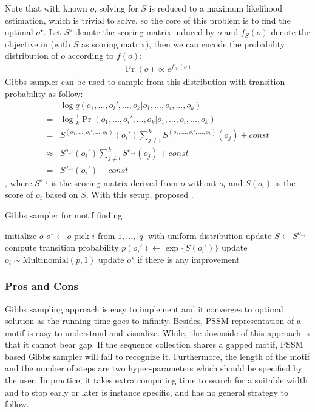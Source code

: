 \documentclass[11pt, oneside]{article}
\begin{document}
Note that with known $o$, solving for $S$ is reduced to a maximum likelihood estimation, which is trivial to solve, so the core of this problem is to find the optimal $o^{\star}$. Let $S^o$ denote the scoring matrix induced by $o$ and $f_{S}(o)$ denote the objective in  (with $S$ as scoring matrix), then we can encode the probability distribution of $o$ according to $f(o)$:
\begin{align*}
  \Pr(o) \propto e^{f_{S^o}(o)}
\end{align*} 
Gibbs sampler can be used to sample from this distribution with transition probability as follow:
\begin{align}
  & \log q(o_1, ..., o_i', ..., o_k|o_1, ..., o_i, ..., o_k) \nonumber \\
  =& \log \frac{1}{k}\Pr(o_1, ..., o_i', ..., o_k|o_1, ..., o_i, ..., o_k) \label{eq:exact}\\
  =& S^{(o_1, ..., o_i', ..., o_k)}(o_i')\sum_{j \neq i}^k S^{(o_1, ..., o_i', ..., o_k)}(o_j) + const \nonumber \\
  \approx& S^{o_{-i}}(o_i')\sum_{j \neq i}^k S^{o_{-i}}(o_j) + const \nonumber \\
  =& S^{o_{-i}}(o_i') + const \label{eq:approx}
\end{align} 
, where $S^{o_{-i}}$ is the scoring matrix derived from $o$ without $o_i$ and $S(o_i)$ is the score of $o_i$ based on $S$. With this setup, \cite{lawrence1993detecting} proposed .
\begin{algorithm}
  \caption{Gibbs sampler for motif finding}
  \label{algo:gibbs}
  \begin{algorithmic}[1]
    \State initialize $o$
    \State $o^{\star} \leftarrow o$
      \State pick $i$ from $1, ..., |q|$ with uniform distribution
      \State update $S \leftarrow S^{o_{-i}}$
      \State compute transition probability $p(o_i') \leftarrow \exp\{S(o_i')\}$
      \State update $o_i \sim \text{Multinomial}(p, 1)$
      \State update $o^{\star}$ if there is any improvement
    \EndWhile
  \end{algorithmic}
\end{algorithm}

\subsubsection{Pros and Cons}

Gibbs sampling approach is easy to implement and it converges to optimal solution as the running time goes to infinity. Besides, PSSM representation of a motif is easy to understand and visualize. While, the downside of this approach is that it cannot bear gap. If the sequence collection shares a gapped motif, PSSM based Gibbs sampler will fail to recognize it. Furthermore, the length of the motif and the number of steps are two hyper-parameters which should be specified by the user. In practice, it takes extra computing time to search for a suitable width and to stop early or later is instance specific, and has no general strategy to follow.
\end{document}
